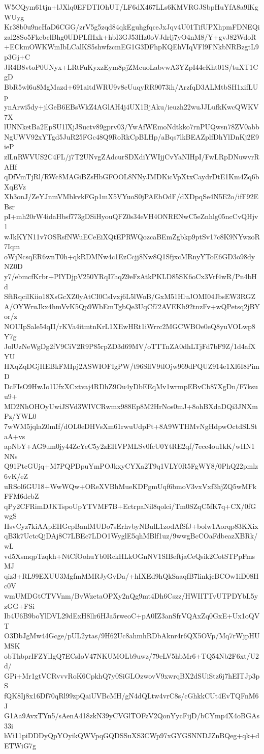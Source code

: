 W5CQym61tjn+lJXlq0EFDTIOhUT/LF6dX467LLs6KMVRGJSbpHuYfA8a9lKgWUyg
Kr38b0u9ncHaD6CGG/zrV5g5zqd84qkEguhgfqceJxJqv4U01TifUPXhpmFDNEQi
zal28So5FkebclBhg0UDPLfHxk+hbI3GJ53Hz0oVJdrlj7yO4nM8/Y+gvJ82WdoR
+ECkmOWKWmIbLCalKS5shwfzcmEG1G3DFhpKQEhVIqVFl9FNkbNRBzgtL9p3Gj+C
JR4B8vtoP0UNyx+LRtFuKyxzEym8pjZMcuoLabvwA3YZpI44eKht01S/tuXT1CgD
BbR5wl6u8MgMazd+691aitdWRU9v8cUuqyRR9073ih/ArzfqD3ALMtbSH1xifLUp
ynArwi5dy+jlGeB6EBsWkZ4AGlAH4j4UX1BjAku/ieuzh22wuJJLufkKwcQWKV7X
lUNNketBa2EpSU1lXjJSuctv89gprv03/YwAfWEmoNdtkko7rnPUQwsn78ZV0abb
NgUWV92xYTgd5JuR25FGc48Q9RoRkCpBLHp/aBqs7lkBEAZplfDhYlDnKj2E9ieP
zlLnRWVUS2C4FL/j7T2UNvgZAdcurSDXdiYWIjjCvYaNIHpI/FwLRpDNuwvrRAHf
qDfVmTjRl/RWc8MAGiBZsHbGFOOL8NNyJMDKicVpXtxCaydrDtE1Km4Zq6bXqEVz
Xh3onJ/ZeYJnmVMbkvkFGp1mX5VYuoS0jPAEbOdF/dXDpqSe4N5E2o/ifF92EBsr
pI+mh20rW4idaHbsf773gDSiHyouQFZ0s34eVH4ONRENwC5eZnhlg05ncCvQHjv1
wJkKYN11v7OSRsfNWuECeEiXQtEPRWQozcaBEmZgbkp9ptSv17c8K9NYwzoR7Iqm
oWjNcsqER6wnT0h+qkRDMNw4c1EzCcjj8Nw8Q1SfjxcMRnyYToE6GD3o98dyNZ0D
y7/ebmcfKrbr+PlYDjpV250YRqI7hqZ9eFzAtkPKLD85SK6oCx3Vrf4wR/Pn4bHd
SftRqcilKiio18XsGcXZ0yAtCI0CsIvxj6L5lWoB/GxM51HluJOMI04JbsEW3RGZ
A/OYWruJkx4hmVvK5Qp9WbEmTgbQe3UqCf72AVEKh92tnzFv+wQPetsq2jBYor/z
NOUIpSale54qII/rKVa4itmtnKrL1XEwHRt1iWrrc2MGCWBOe0eQ8yuVOLwp8Y7g
JolUzNeWgDg2fV9CiV2R9P85rpZD3d69MV/oTTTnZA0dhLTjFd7bF9Z/1d4afXYU
HXqZqDGjHEBkFMIpj2ASWIOFIgPW/t96SflV9tlOjw969dPQUZ914e1Xl6I8PimD
DcFIsO9HwJo1UfxXCxtvaj4RDhZ9Ou4yDbEEqMv1wrmpEBvCb87XgDn/F7ksuu9+
MD2NhOHOyUwiJSVd3WlVCRwmx988Ep8M2HrNos0mJ+8ohBXdaDQi3JNXmPz/YWL0
7wWM5jqlaZ0mIf/dOL0eDHVsXm61rwuUdpPt+8A9WTHMvNgHdpwOctdSLStaA+vs
apNbY+AG9um0jy44ZcYeC5y2zEHVPMLSv0fcU0YtRE2qf/7ece4ou1kK/wHN1NNs
Q91PtcGUjq+M7PQPDpuYmPOJkxyCYXa2T9q1VLY0R5FgWY8/0PhQ22pmlz6vK/eZ
uRSol6GU18+WwWQw+OReXVBhMueKDPgmUqf6bmoV3vxVxf3hjZQ5wMFkFFM6dcbZ
qPy2CFRimDJKTspoUpYTVMF7B+EctrpaNil8qolci/Tm0SZqC5fK7q+CX/0fGwgS
HsvCyz7kiAApEHGcpBanlMUDo7sErhvbyNBulL1zodAfSfJ+bolw1Aorqp83KXix
qB3k7UctcQjDAj8C7LBEc7LDO1WyglE5qhMBlf1uz/9wwgBcCOaFdbeazXBRk/wL
vd5XsmqpTzqkh+NtCfOohuYb0RckHLkOGnNV1SIBeftjaCeQsik2CotSTPpFmsMJ
qiz3+RL99EXUU3MgfmMMRJyGvDa/+hIXEd9hQkSaaqfB7linkjcBCOw1iD08Hc0V
wmUMDGtCTVVnm/BvWzetaOPXy2nQg9mt4Dh6Cszz/HWIITTvUTPDYbL5yzGG+FSi
Ib4U6B9boYlDVL29dExH8llr6HJa5rweoC+pA0IZ3anSfrVQAxZq0GxE+Ux1oQVT
O3DbJgMw44Gcge/pUL2ytas/9H62Uc8ahmhRDbAknr4r6QX5OVp/Mq7rWjpHUMSK
obThbprIFZYlIgQ7ECsIoV47NKUMOLb9uwz/79eLV5hbMr6+TQ54Nb2F6xt/U2d/
GPi+Mr1gtVCRvvvRoK6CpkhQ7y0SiGLOzwovV9xwrqBX2dSUiStz6j7hEITJp3pS
fQK8Ij8x16Df70qRl99zpQaiUVBcMH/gN4dQLtw4vrC8s/cGhkkCUt4EvTQFnM6J
G1Aa9AvxTYn5/sAenA418zkN39yCVGlTOFzV2QonYycFijD/bCYmp4X4oBGAs33i
hVi11piDDDyQpYOyikQWVpqGQDSSuXS3CWp97xGYGSNNDJZnBQeg+qk+dETWiG7g

